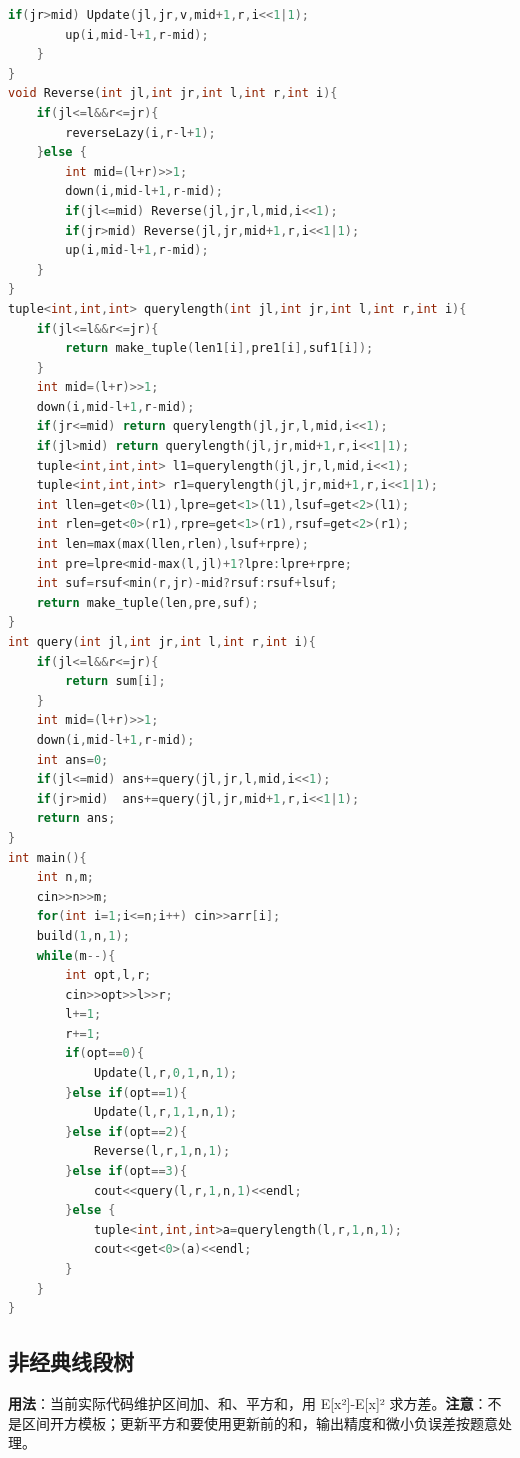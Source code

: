 \documentclass[a4paper,9pt]{extarticle}
\begin{document}
\begin{lstlisting}[language={C++}]
        if(jr>mid) Update(jl,jr,v,mid+1,r,i<<1|1);
        up(i,mid-l+1,r-mid);
    }
}
void Reverse(int jl,int jr,int l,int r,int i){
    if(jl<=l&&r<=jr){
        reverseLazy(i,r-l+1);
    }else {
        int mid=(l+r)>>1;
        down(i,mid-l+1,r-mid);
        if(jl<=mid) Reverse(jl,jr,l,mid,i<<1);
        if(jr>mid) Reverse(jl,jr,mid+1,r,i<<1|1);
        up(i,mid-l+1,r-mid);
    }
}
tuple<int,int,int> querylength(int jl,int jr,int l,int r,int i){
    if(jl<=l&&r<=jr){
        return make_tuple(len1[i],pre1[i],suf1[i]);
    }
    int mid=(l+r)>>1;
    down(i,mid-l+1,r-mid);
    if(jr<=mid) return querylength(jl,jr,l,mid,i<<1);
    if(jl>mid) return querylength(jl,jr,mid+1,r,i<<1|1);
    tuple<int,int,int> l1=querylength(jl,jr,l,mid,i<<1);
    tuple<int,int,int> r1=querylength(jl,jr,mid+1,r,i<<1|1);
    int llen=get<0>(l1),lpre=get<1>(l1),lsuf=get<2>(l1);
    int rlen=get<0>(r1),rpre=get<1>(r1),rsuf=get<2>(r1);
    int len=max(max(llen,rlen),lsuf+rpre);
    int pre=lpre<mid-max(l,jl)+1?lpre:lpre+rpre;
    int suf=rsuf<min(r,jr)-mid?rsuf:rsuf+lsuf;
    return make_tuple(len,pre,suf);
}
int query(int jl,int jr,int l,int r,int i){
    if(jl<=l&&r<=jr){
        return sum[i];
    }
    int mid=(l+r)>>1;
    down(i,mid-l+1,r-mid);
    int ans=0;
    if(jl<=mid) ans+=query(jl,jr,l,mid,i<<1); 
    if(jr>mid)  ans+=query(jl,jr,mid+1,r,i<<1|1);
    return ans;
}
int main(){
    int n,m;
    cin>>n>>m;
    for(int i=1;i<=n;i++) cin>>arr[i];
    build(1,n,1);
    while(m--){
        int opt,l,r;
        cin>>opt>>l>>r;
        l+=1;
        r+=1;
        if(opt==0){
            Update(l,r,0,1,n,1);
        }else if(opt==1){
            Update(l,r,1,1,n,1);
        }else if(opt==2){
            Reverse(l,r,1,n,1);
        }else if(opt==3){
            cout<<query(l,r,1,n,1)<<endl;
        }else {
            tuple<int,int,int>a=querylength(l,r,1,n,1);
            cout<<get<0>(a)<<endl;
        }
    }
}
\end{lstlisting}

\subsection{非经典线段树}

\textbf{用法}：当前实际代码维护区间加、和、平方和，用 E[x²]-E[x]² 求方差。\textbf{注意}：不是区间开方模板；更新平方和要使用更新前的和，输出精度和微小负误差按题意处理。
\end{document}
